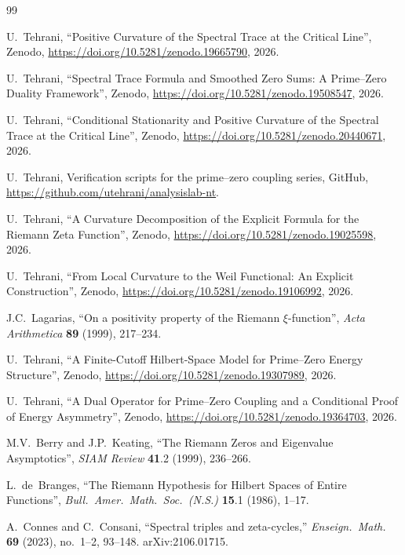 \documentclass[11pt]{article}
\begin{document}
\newpage
\begin{thebibliography}{99}

U.~Tehrani,
``Positive Curvature of the Spectral Trace at the Critical Line'',
Zenodo, \url{https://doi.org/10.5281/zenodo.19665790}, 2026.

U.~Tehrani,
``Spectral Trace Formula and Smoothed Zero Sums:
A Prime--Zero Duality Framework'',
Zenodo, \url{https://doi.org/10.5281/zenodo.19508547}, 2026.

U.~Tehrani,
``Conditional Stationarity and Positive Curvature of the Spectral Trace
at the Critical Line'',
Zenodo, \url{https://doi.org/10.5281/zenodo.20440671}, 2026.

U.~Tehrani,
Verification scripts for the prime--zero coupling series,
GitHub, \url{https://github.com/utehrani/analysislab-nt}.

U.~Tehrani,
``A Curvature Decomposition of the Explicit Formula
for the Riemann Zeta Function'',
Zenodo, \url{https://doi.org/10.5281/zenodo.19025598}, 2026.

U.~Tehrani,
``From Local Curvature to the Weil Functional:
An Explicit Construction'',
Zenodo, \url{https://doi.org/10.5281/zenodo.19106992}, 2026.

J.C.~Lagarias,
``On a positivity property of the Riemann $\xi$-function'',
\emph{Acta Arithmetica} \textbf{89} (1999), 217--234.

U.~Tehrani,
``A Finite-Cutoff Hilbert-Space Model for Prime--Zero Energy Structure'',
Zenodo, \url{https://doi.org/10.5281/zenodo.19307989}, 2026.

U.~Tehrani,
``A Dual Operator for Prime--Zero Coupling
and a Conditional Proof of Energy Asymmetry'',
Zenodo, \url{https://doi.org/10.5281/zenodo.19364703}, 2026.

M.V.~Berry and J.P.~Keating,
``The Riemann Zeros and Eigenvalue Asymptotics'',
\emph{SIAM Review} \textbf{41}.2 (1999), 236--266.

L.~de~Branges,
``The Riemann Hypothesis for Hilbert Spaces of Entire Functions'',
\emph{Bull.\ Amer.\ Math.\ Soc.\ (N.S.)} \textbf{15}.1 (1986), 1--17.

A.~Connes and C.~Consani,
``Spectral triples and zeta-cycles,''
\textit{Enseign.\ Math.} \textbf{69} (2023), no.~1--2, 93--148.
arXiv:2106.01715.


\end{thebibliography}
\end{document}
